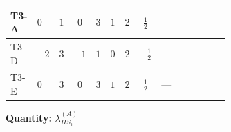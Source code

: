 \documentclass[8pt]{article}
\begin{document}
\begin{landscape}
\begin{longtable}{@{}llcccccc >{\raggedright\arraybackslash}p{0.21\linewidth} >{\raggedright\arraybackslash}p{0.21\linewidth} >{\raggedright\arraybackslash}p{0.21\linewidth}@{}}
\midrule
T3-A & $0$ & $1$ & $0$ & $3$ & $1$ & $2$ & $\frac{1}{2}$ & --- & --- & --- \\
\midrule
T3-D & $-2$ & $3$ & $-1$ & $1$ & $0$ & $2$ & $-\frac{1}{2}$ & --- & \scriptsize\adjustbox{max width=\linewidth}{$\begin{gathered} +2 {\lambda_1} {\lambda_{HS_1}^{(A)}}\end{gathered}$} & \scriptsize\adjustbox{max width=\linewidth}{$\begin{gathered} +8 {\lambda_{HS_1}^{(1)}} {\lambda_{HS_1}^{(A)}}\end{gathered}$} \\
\midrule
T3-E & $0$ & $3$ & $0$ & $3$ & $1$ & $2$ & $\frac{1}{2}$ & --- & \scriptsize\adjustbox{max width=\linewidth}{$\begin{gathered} +2 {\lambda_1} {\lambda_{HS_1}^{(A)}}\end{gathered}$} & \scriptsize\adjustbox{max width=\linewidth}{$\begin{gathered} +8 {\lambda_{HS_1}^{(1)}} {\lambda_{HS_1}^{(A)}}\end{gathered}$} \\
\midrule
\bottomrule
\end{longtable}
\clearpage
\noindent\textbf{Quantity: }$\lambda_{HS_1}^{(A)}$\par\smallskip

\end{landscape}
\end{document}
